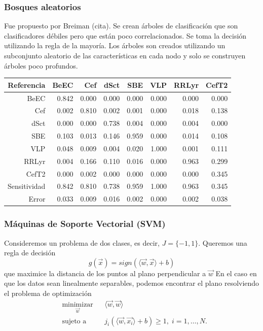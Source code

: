 \documentclass{beamer}
\begin{document}
\begin{frame}
  \frametitle{Bosques aleatorios}
  Fue propuesto por Breiman (cita). Se crean árboles de clasificación que son clasificadores débiles pero que están poco correlacionados. Se toma la decisión utilizando la regla de la mayoría. Los árboles son creados utilizando un subconjunto aleatorio de las características en cada nodo y solo se construyen árboles poco profundos.
  \begin{table}[ht]
    \centering
    \resizebox{0.7\textwidth}{!} {
      \begin{tabular}{rrrrrrrr}
        \hline
        Referencia & BeEC & Cef & dSct & SBE & VLP & RRLyr & CefT2 \\ 
        \hline
        BeEC & 0.842 & 0.000 & 0.000 & 0.000 & 0.000 & 0.000 & 0.000 \\ 
        Cef & 0.002 & 0.810 & 0.002 & 0.001 & 0.000 & 0.018 & 0.138 \\ 
        dSct & 0.000 & 0.000 & 0.738 & 0.004 & 0.000 & 0.004 & 0.000 \\ 
        SBE & 0.103 & 0.013 & 0.146 & 0.959 & 0.000 & 0.014 & 0.108 \\ 
        VLP & 0.048 & 0.009 & 0.004 & 0.020 & 1.000 & 0.001 & 0.111 \\ 
        RRLyr & 0.004 & 0.166 & 0.110 & 0.016 & 0.000 & 0.963 & 0.299 \\ 
        CefT2 & 0.000 & 0.002 & 0.000 & 0.000 & 0.000 & 0.000 & 0.345 \\
        \hline
        \hline
        Sensitividad &  0.842 & 0.810 & 0.738 & 0.959 & 1.000 & 0.963 & 0.345 \\
        \hline
        Error & 0.033 & 0.009 & 0.016 & 0.002 & 0.000 & 0.002 & 0.038 \\ 
        \hline
        \hline
      \end{tabular}
    }
  \end{table}
\end{frame}



\begin{frame}
\frametitle{Máquinas de Soporte Vectorial (SVM)}
Consideremos un problema de dos clases, es decir, $J=\{-1,1\}$. Queremos una regla de decisión 
\begin{equation}
g(\vec{x}) = sign(\langle \vec{w}, \vec{x}\rangle + b)
\end{equation}
que maximice la distancia de los puntos al plano perpendicular a $\vec{w}$
En el caso en que los datos sean linealmente separables, podemos encontrar el plano resolviendo el problema de optimización
\begin{equation*}
\begin{aligned}
& \underset{\vec{w}}{\text{minimizar}}
& & \langle \vec{w}, \vec{w} \rangle \\
& \text{sujeto a}
& & j_i(\langle \vec{w}, \vec{x_i}\rangle + b)\geq 1, \; i = 1, \ldots, N.
\end{aligned}
\end{equation*}
\end{frame}
\end{document}
